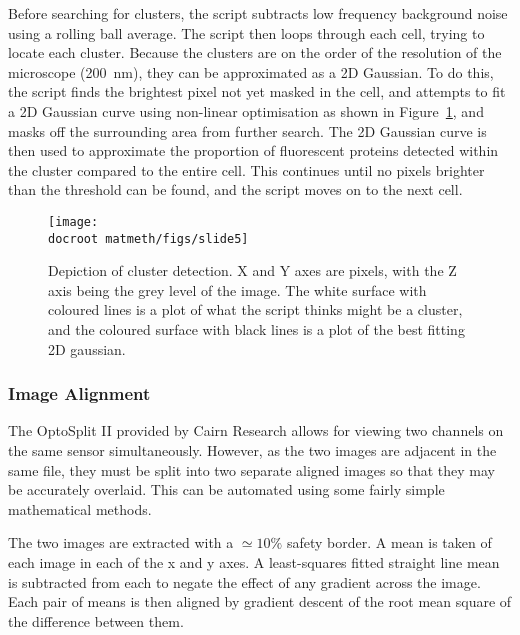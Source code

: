 \documentclass[../main.tex]{subfiles}
\begin{document}
Before searching for clusters, the script subtracts low frequency background noise using a rolling ball average. The script then loops through each cell, trying to locate each cluster. Because the clusters are on the order of the resolution of the microscope (\SI{200}{\nano\meter}), they can be approximated as a 2D Gaussian. To do this, the script finds the brightest pixel not yet masked in the cell, and attempts to fit a 2D Gaussian curve using non-linear optimisation as shown in Figure~\ref{fig:imageprocessing:clusterdetection}, and masks off the surrounding area from further search. The 2D Gaussian curve is then used to approximate the proportion of fluorescent proteins detected within the cluster compared to the entire cell. This continues until no pixels brighter than the threshold can be found, and the script moves on to the next cell.

\begin{figure}[h!]
\begin{center}
\texttt{[image: \\docroot matmeth/figs/slide5]}
\caption[Depiction of cluster detection]{Depiction of cluster detection. X and Y axes are pixels, with the Z axis being the grey level of the image. The white surface with coloured lines is a plot of what the script thinks might be a cluster, and the coloured surface with black lines is a plot of the best fitting 2D gaussian.}
\label{fig:imageprocessing:clusterdetection}
\end{center}
\end{figure}



\subsubsection{Image Alignment}

The OptoSplit II provided by Cairn Research allows for viewing two channels on the same sensor simultaneously. However, as the two images are adjacent in the same file, they must be split into two separate aligned images so that they may be accurately overlaid. This can be automated using some fairly simple mathematical methods.

The two images are extracted with a \(\simeq10\%\) safety border. A mean is taken of each image in each of the x and y axes. A least-squares fitted straight line mean is subtracted from each to negate the effect of any gradient across the image. Each pair of means is then aligned by gradient descent of the root mean square of the difference between them.
\end{document}
